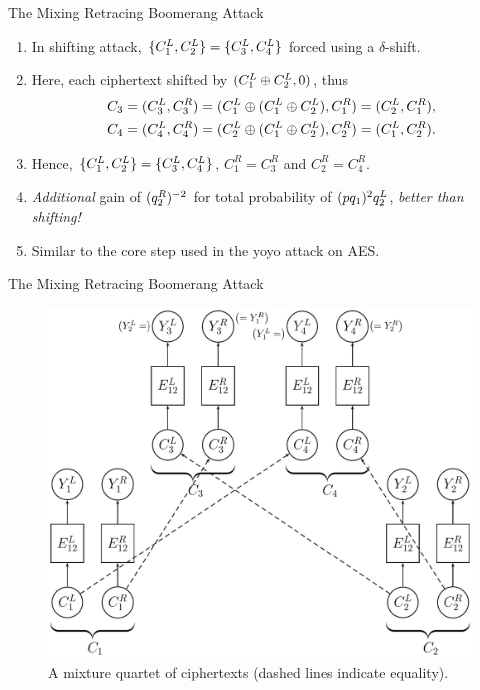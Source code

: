 \documentclass[notheorems]{beamer}
\theoremstyle{definition}
\theoremstyle{example}
\begin{document}
    \begin{frame}[<+->]{The Mixing Retracing Boomerang Attack}
        \begin{enumerate}
            \item In shifting attack, \(\{C_1^L, C_2^L\} = \{C_3^L,
            C_4^L\}\) forced using a \(\delta\)-shift.
            \item Here, each ciphertext shifted by \((C_1^L \oplus C_2^L,
            0)\), thus
            \begin{align}
                C_3 &= (C_3^L, C_3^R) = (C_1^L \oplus (C_1^L \oplus C_2^L), C_1^R) = (C_2^L, C_1^R), \\
                C_4 &= (C_4^L, C_4^R) = (C_2^L \oplus (C_1^L \oplus C_2^L), C_2^R) = (C_1^L, C_2^R).
            \end{align}
            \item Hence, \(\{C_1^L, C_2^L\} = \{C_3^L, C_4^L\}\),
            \(C_1^R = C_3^R\) and \(C_2^R = C_4^R\).
            \item \emph{Additional} gain of \((q_2^R)^{-2}\) for total
            probability of \((pq_1)^2q_2^L\), \emph{better than shifting!}
            \item Similar to the core step used in the yoyo attack on AES.
        \end{enumerate}
    \end{frame}

    \begin{frame}{The Mixing Retracing Boomerang Attack}
        \begin{figure}
            \centering
            \includegraphics[width=0.55\columnwidth]{images/mixing_boomerang.png}
            \caption{A mixture quartet of ciphertexts (dashed lines indicate equality).}
        \end{figure}
    \end{frame}
\end{document}
